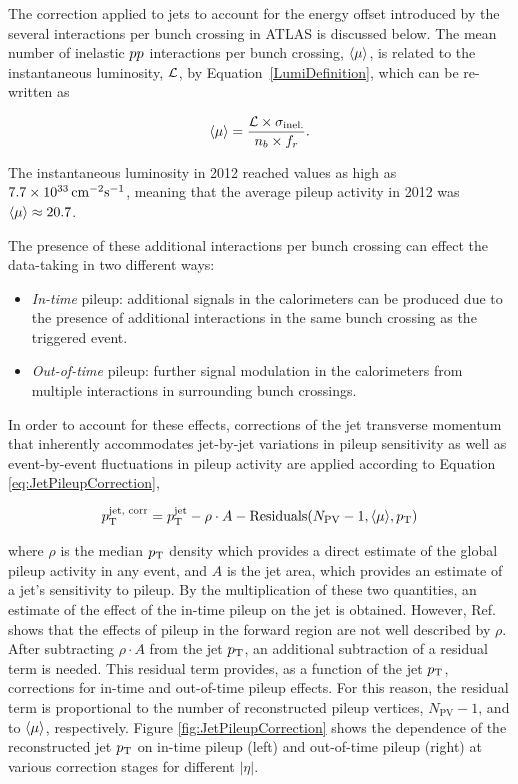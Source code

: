 The correction applied to jets to account for the energy offset introduced by the several interactions per bunch crossing in ATLAS is discussed below.
The mean number of inelastic $pp$ interactions per bunch crossing, $\langle\mu\rangle$, is related to the instantaneous luminosity, $\mathcal{L}$, by Equation~\ref{LumiDefinition}, which can be re-written as

\begin{equation}
\averageIntXing = \frac{\InstLumi \times \sigma_{\text{inel.}}}{n_b \times f_r}.
\label{eq:intPerXing}
\end{equation}

The instantaneous luminosity in 2012 reached values as high as $\unit[7.7\times10^{33}]{cm^{-2} s^{-1}}$, meaning that the average pileup activity in 2012 was $\langle\mu\rangle \approx 20.7$.

The presence of these additional interactions per bunch crossing can effect the data-taking in two different ways:

\begin{itemize}
\item{\emph{In-time} pileup: } additional signals in the calorimeters can be produced due to the presence of additional interactions in the same bunch crossing as the triggered event.
\item{\emph{Out-of-time} pileup:} further signal modulation in the calorimeters from multiple interactions in surrounding bunch crossings.
\end{itemize}

In order to account for these effects, corrections of the jet transverse momentum that inherently accommodates jet-by-jet variations in pileup sensitivity as well as event-by-event fluctuations in pileup activity are applied according to Equation \ref{eq:JetPileupCorrection},

\begin{equation}
p_{\mathrm{T}}^{\text{jet, corr}} = p_{\mathrm{T}}^{\text{jet}} - \rho \cdot A - \text{Residuals}(N_{\text{PV}}-1, \langle\mu\rangle, p_{\mathrm{T}})
\label{eq:JetPileupCorrection}
\end{equation}

\noindent where $\rho$ is the median $p_{\mathrm{T}}$ density which provides a direct estimate of the global pileup activity in any event, and $A$ is the jet area, which provides an estimate of a jet's sensitivity to pileup. By the multiplication of these two quantities, an estimate of the effect of the in-time pileup on the jet is obtained.
However, Ref.~\cite{TheATLAScollaboration:2013pia} shows that the effects of pileup in the forward region are not well described by $\rho$. 
After subtracting $\rho \cdot A$ from the jet $p_{\mathrm{T}}$, an additional subtraction of a residual term is needed.
This residual term provides, as a function of the jet $p_{\mathrm{T}}$, corrections for in-time and out-of-time pileup effects.
For this reason, the residual term is proportional to the number of reconstructed pileup vertices, $N_{\text{PV}}-1$, and to $\langle\mu\rangle$, respectively.
Figure \ref{fig:JetPileupCorrection} shows the dependence of the reconstructed jet $p_{\mathrm{T}}$ on in-time pileup (left) and out-of-time pileup (right) at various correction stages for different $|\eta|$.

